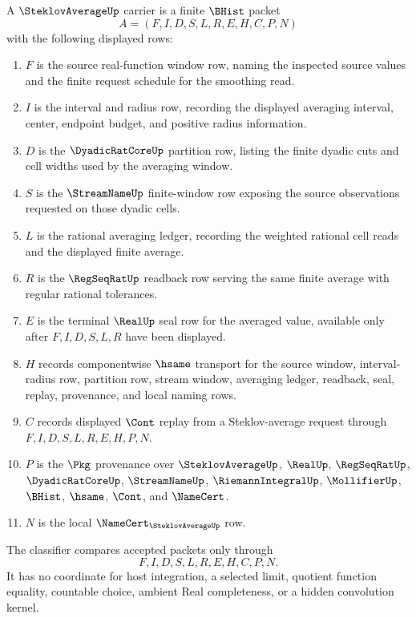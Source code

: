 \begin{definition}
\label{def:steklov-average-carrier}
A $\SteklovAverageUp$ carrier is a finite $\BHist$ packet
$$
A=(F,I,D,S,L,R,E,H,C,P,N)
$$
with the following displayed rows:
\begin{enumerate}
\item $F$ is the source real-function window row, naming the inspected source values and the finite request schedule for the smoothing read.
\item $I$ is the interval and radius row, recording the displayed averaging interval, center, endpoint budget, and positive radius information.
\item $D$ is the $\DyadicRatCoreUp$ partition row, listing the finite dyadic cuts and cell widths used by the averaging window.
\item $S$ is the $\StreamNameUp$ finite-window row exposing the source observations requested on those dyadic cells.
\item $L$ is the rational averaging ledger, recording the weighted rational cell reads and the displayed finite average.
\item $R$ is the $\RegSeqRatUp$ readback row serving the same finite average with regular rational tolerances.
\item $E$ is the terminal $\RealUp$ seal row for the averaged value, available only after $F,I,D,S,L,R$ have been displayed.
\item $H$ records componentwise $\hsame$ transport for the source window, interval-radius row, partition row, stream window, averaging ledger, readback, seal, replay, provenance, and local naming rows.
\item $C$ records displayed $\Cont$ replay from a Steklov-average request through $F,I,D,S,L,R,E,H,P,N$.
\item $P$ is the $\Pkg$ provenance over $\SteklovAverageUp$, $\RealUp$, $\RegSeqRatUp$, $\DyadicRatCoreUp$, $\StreamNameUp$, $\RiemannIntegralUp$, $\MollifierUp$, $\BHist$, $\hsame$, $\Cont$, and $\NameCert$.
\item $N$ is the local $\NameCert_{\SteklovAverageUp}$ row.
\end{enumerate}
The classifier compares accepted packets only through
$$
F,I,D,S,L,R,E,H,C,P,N.
$$
It has no coordinate for host integration, a selected limit, quotient function equality, countable choice, ambient Real completeness, or a hidden convolution kernel.
\end{definition}

